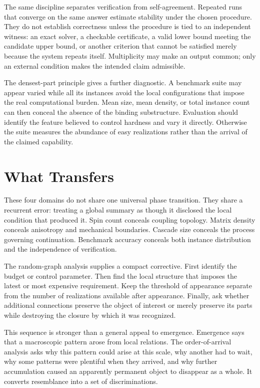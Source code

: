 \documentclass[11pt]{article}
\begin{document}
The same discipline separates verification from self-agreement. Repeated runs that converge on the same answer estimate stability under the chosen procedure. They do not establish correctness unless the procedure is tied to an independent witness: an exact solver, a checkable certificate, a valid lower bound meeting the candidate upper bound, or another criterion that cannot be satisfied merely because the system repeats itself. Multiplicity may make an output common; only an external condition makes the intended claim admissible.

The densest-part principle gives a further diagnostic. A benchmark suite may appear varied while all its instances avoid the local configurations that impose the real computational burden. Mean size, mean density, or total instance count can then conceal the absence of the binding substructure. Evaluation should identify the feature believed to control hardness and vary it directly. Otherwise the suite measures the abundance of easy realizations rather than the arrival of the claimed capability.

\section{What Transfers}

These four domains do not share one universal phase transition. They share a recurrent error: treating a global summary as though it disclosed the local condition that produced it. Spin count conceals coupling topology. Matrix density conceals anisotropy and mechanical boundaries. Cascade size conceals the process governing continuation. Benchmark accuracy conceals both instance distribution and the independence of verification.

The random-graph analysis supplies a compact corrective. First identify the budget or control parameter. Then find the local structure that imposes the latest or most expensive requirement. Keep the threshold of appearance separate from the number of realizations available after appearance. Finally, ask whether additional connections preserve the object of interest or merely preserve its parts while destroying the closure by which it was recognized.

This sequence is stronger than a general appeal to emergence. Emergence says that a macroscopic pattern arose from local relations. The order-of-arrival analysis asks why this pattern could arise at this scale, why another had to wait, why some patterns were plentiful when they arrived, and why further accumulation caused an apparently permanent object to disappear as a whole. It converts resemblance into a set of discriminations.
\end{document}
